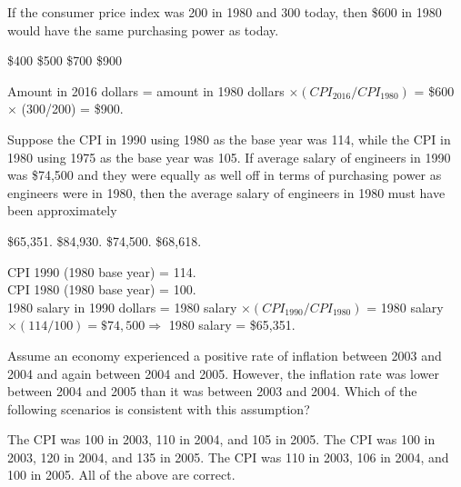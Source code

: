 \documentclass[addpoints,11pt]{exam}
\theoremstyle{definition}
\newcommand{\blank}[0]{\underline{\hspace{3cm}}}
\begin{document}
\begin{questions}

			\question If the consumer price index was 200 in 1980 and 300 today, then \$600 in 1980 would have the same purchasing power as \blank today.
			
			\begin{choices}
				\choice \$400
				\choice \$500
				\choice \$700
				\CorrectChoice \$900
			\end{choices}
			
		\begin{solution}
			Amount in 2016 dollars = amount in 1980 dollars $\times (CPI_{2016}/CPI_{1980})$ = \$600 $\times$ (300/200) = \$900.
		\end{solution}

		\question Suppose the CPI in 1990 using 1980 as the base year was 114, while the CPI in 1980 using 1975 as the base year was 105. If average salary of engineers in 1990 was \$74,500 and they were equally as well off in terms of purchasing power as engineers were in 1980, then the average salary of engineers in 1980 must have been approximately
		
		\begin{choices}
			\CorrectChoice \$65,351.
			\choice \$84,930.
			\choice \$74,500.
			\choice \$68,618.
		\end{choices}
		
		\begin{solution}
			CPI 1990 (1980 base year) = 114. \\
			CPI 1980 (1980 base year) = 100. \\
			1980 salary in 1990 dollars = 1980 salary $\times (CPI_{1990}/CPI_{1980})$ = 1980 salary $\times (114/100) = \$74,500 \Rightarrow$ 1980 salary = \$65,351. 
		\end{solution}
		

	\question Assume an economy experienced a positive rate of inflation between 2003 and 2004 and again between 2004 and 2005. However, the inflation rate was lower between 2004 and 2005 than it was between 2003 and 2004. Which of the following scenarios is consistent with this assumption?
	
	
	
	\begin{choices}
		\choice The CPI was 100 in 2003, 110 in 2004, and 105 in 2005.
		\CorrectChoice The CPI was 100 in 2003, 120 in 2004, and 135 in 2005.
		\choice The CPI was 110 in 2003, 106 in 2004, and 100 in 2005.
		\choice All of the above are correct.
	\end{choices}
			

\end{questions}
\end{document}

